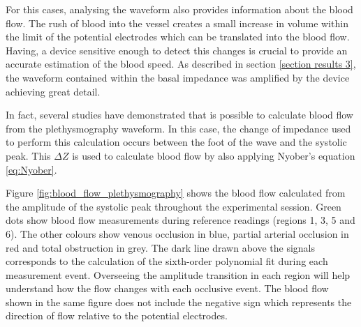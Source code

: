 For this cases, analysing the waveform also provides information about the blood flow.  The rush of blood into the vessel creates a small increase in volume within the limit of the potential electrodes which can be translated into the blood flow. Having, a device sensitive enough to detect this changes is crucial to provide an accurate estimation of the blood speed. As described in section \ref{section results 3}, the waveform contained within the basal impedance was amplified by the device achieving great detail. 

In fact, several studies  have demonstrated that is possible to calculate blood flow from the plethysmography waveform. In this case, the change of impedance used to perform this calculation occurs between the foot of the wave and the systolic peak. This $\Delta Z$ is used to calculate blood flow by also applying Nyober's equation \ref{eq:Nyober}. 

Figure \ref{fig:blood_flow_plethysmography} shows the blood flow calculated from the amplitude of the systolic peak throughout the experimental session. Green dots show blood flow measurements during reference readings (regions 1, 3, 5 and 6). The other colours show venous occlusion in blue, partial arterial occlusion in red and total obstruction in grey. The dark line drawn above the signals corresponds to the calculation of the sixth-order polynomial fit during each measurement event. Overseeing the amplitude transition in each region will help understand how the flow changes with each occlusive event. The blood flow shown in the same figure does not include the negative sign which represents the direction of flow relative to the potential electrodes.

